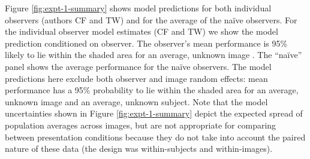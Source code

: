 \documentclass[article, 11pt,a4paper,natbib]{apa6}\usepackage[]{graphicx}\usepackage[]{color}
\begin{document}
Figure \ref{fig:expt-1-summary} shows model predictions for both individual observers (authors CF and TW) and for the average of the na\"{i}ve observers.
For the individual observer model estimates (CF and TW) we show the model prediction conditioned on observer. 
The observer's mean performance is 95\% likely to lie within the shaded area for an average, unknown image \citep{baayen_mixed-effects_2008}.
The ``na\"{i}ve'' panel shows the average performance for the na\"{i}ve observers.
The model predictions here exclude both observer and image random effects: mean performance has a 95\% probability to lie within the shaded area for an average, unknown image and an average, unknown subject.
Note that the model uncertainties shown in Figure \ref{fig:expt-1-summary} depict the expected spread of population averages across images, but are not appropriate for comparing between presentation conditions because they do not take into account the paired nature of these data (the design was within-subjects and within-images).
\end{document}
